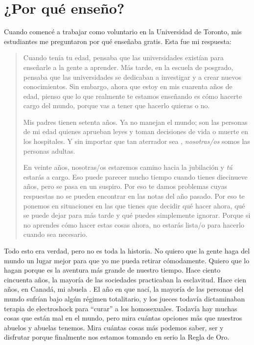 \chapter{¿Por qué enseño?}\label{s:finale}

Cuando comencé a trabajar como voluntario en la Universidad de Toronto,
mis estudiantes me preguntaron por qué enseñaba gratis.
Esta fue mi respuesta:

\begin{quote}

Cuando tenía tu edad,
pensaba que las universidades existían para enseñarle a la gente a aprender.
Más tarde,
en la escuela de posgrado,
pensaba que las universidades se dedicaban a investigar y a crear nuevos conocimientos.
Sin embargo, ahora que estoy en mis cuarenta años de edad,
pienso que lo que realmente te estamos enseñando es
cómo hacerte cargo del mundo,
porque vas a tener que hacerlo quieras o no.

Mis padres tienen setenta años.
Ya no manejan el mundo;
son las personas de mi edad quienes aprueban leyes
y toman decisiones de vida o muerte en los hospitales.
Y sin importar que tan aterrador sea ,
\emph{nosotras/os} somos las personas adultas.

En veinte años,
nosotras/os estaremos camino hacia la jubilación y \emph{tú} estarás a cargo.
Eso puede parecer mucho tiempo cuando tienes diecinueve años,
pero se pasa en un suspiro.
Por eso te damos problemas cuyas respuestas no se pueden encontrar en las notas del año pasado.
Por eso te ponemos en situaciones en las que 
tienes que decidir qué hacer ahora, 
qué se puede dejar para más tarde
y qué puedes simplemente ignorar.
Porque si no aprendes cómo hacer estas cosas ahora,
no estarás lista/o para hacerlo cuando sea necesario.

\end{quote}

Todo esto era verdad,
pero no es toda la historia.
No quiero que la gente haga del mundo un lugar mejor para que yo me pueda retirar  cómodamente.
Quiero que lo hagan porque es la aventura más grande  de nuestro tiempo.
Hace ciento cincuenta años,
la mayoría de las sociedades practicaban la esclavitud.
Hace cien años, en Canadá,
mi abuela .
El año en que nací,
la mayoría de las personas del mundo sufrían bajo algún régimen  totalitario,
y los jueces todavía dictaminaban terapia de electroshock para ``curar'' a los homosexuales.
Todavía hay muchas cosas que están mal en el mundo,
pero mira cuántas opciones más que nuestros abuelos y abuelas tenemos. Mira cuántas cosas más podemos saber, ser y disfrutar
porque finalmente nos estamos tomando en serio la Regla de Oro.

